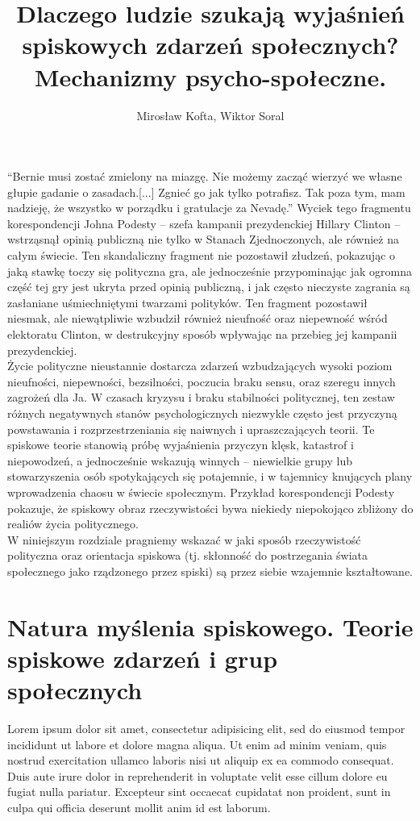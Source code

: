 \documentclass[man]{apa6}
\title{Dlaczego ludzie szukają wyjaśnień spiskowych zdarzeń społecznych? Mechanizmy psycho-społeczne.}
\author{Mirosław Kofta, Wiktor Soral}
\affiliation{Uniwersytet Warszawski}
\begin{document}
    \maketitle
    ``Bernie musi zostać zmielony na miazgę. Nie możemy zacząć wierzyć we własne głupie gadanie o zasadach.[...] Zgnieć go jak tylko potrafisz. Tak poza tym, mam nadzieję, że wszystko w porządku i gratulacje za Nevadę.'' Wyciek tego fragmentu korespondencji Johna Podesty -- szefa kampanii prezydenckiej Hillary Clinton -- wstrząsnął opinią publiczną nie tylko w Stanach Zjednoczonych, ale również na całym świecie. Ten skandaliczny fragment nie pozostawił złudzeń, pokazując o jaką stawkę toczy się polityczna gra, ale jednocześnie przypominając jak ogromna część tej gry jest ukryta przed opinią publiczną, i jak często nieczyste zagrania są zasłaniane uśmiechniętymi twarzami polityków. Ten fragment pozostawił niesmak, ale niewątpliwie wzbudził również nieufność oraz niepewność wśród elektoratu Clinton, w destrukcyjny sposób wpływając na przebieg jej kampanii prezydenckiej.\\

    Życie polityczne nieustannie dostarcza zdarzeń wzbudzających wysoki poziom nieufności, niepewności, bezsilności, poczucia braku sensu, oraz szeregu innych zagrożeń dla Ja. W czasach kryzysu i braku stabilności politycznej, ten zestaw różnych negatywnych stanów psychologicznych niezwykle często jest przyczyną powstawania i rozprzestrzeniania się naiwnych i upraszczających teorii. Te spiskowe teorie stanowią próbę wyjaśnienia przyczyn klęsk, katastrof i niepowodzeń, a jednocześnie wskazują winnych -- niewielkie grupy lub stowarzyszenia osób spotykających się potajemnie, i w tajemnicy knujących plany wprowadzenia chaosu w świecie społecznym. Przykład korespondencji Podesty pokazuje, że spiskowy obraz rzeczywistości bywa niekiedy niepokojąco zbliżony do realiów życia politycznego.\\

    W niniejszym rozdziale pragniemy wskazać w jaki sposób rzeczywistość polityczna oraz orientacja spiskowa (tj. skłonność do postrzegania świata społecznego jako rządzonego przez spiski) są przez siebie wzajemnie kształtowane.

    \section{Natura myślenia spiskowego. Teorie spiskowe zdarzeń i grup społecznych}

    Lorem ipsum dolor sit amet, consectetur adipisicing elit, sed do eiusmod tempor incididunt ut labore et dolore magna aliqua. Ut enim ad minim veniam, quis nostrud exercitation ullamco laboris nisi ut aliquip ex ea commodo consequat. Duis aute irure dolor in reprehenderit in voluptate velit esse cillum dolore eu fugiat nulla pariatur. Excepteur sint occaecat cupidatat non proident, sunt in culpa qui officia deserunt mollit anim id est laborum.
\end{document}
